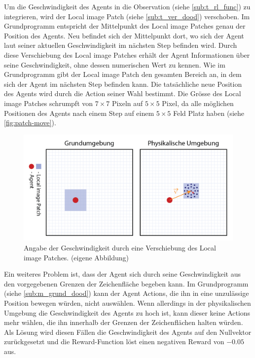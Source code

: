 Um die Geschwindigkeit des Agents in die Observation (siehe
\ref{sub:t_rl_func}) zu integrieren, wird der Local image Patch (siehe
\ref{sub:t_ver_dood}) verschoben. Im Grundprogramm entspricht der
Mittelpunkt des Local image Patches genau der Position des Agents. Neu befindet
sich der Mittelpunkt dort, wo sich der Agent laut seiner aktuellen
Geschwindigkeit im nächsten Step befinden wird. Durch diese Verschiebung des
Local image Patches erhält der Agent Informationen über seine Geschwindigkeit,
ohne dessen numerischen Wert zu kennen. Wie im Grundprogramm gibt der Local
image Patch den gesamten Bereich an, in dem sich der Agent im nächsten Step
befinden kann. Die tatsächliche neue Position des Agents wird durch die Action
seiner Wahl bestimmt. Die Grösse des Local image Patches schrumpft von
$7\times7$ Pixeln auf $5\times5$ Pixel, da alle möglichen Positionen des Agents
nach einem Step auf einem $5\times5$ Feld Platz haben (siehe
\autoref{fig:patch-move}).
 
\begin{figure}[!ht]
 \centering
 \includegraphics[width=\textwidth]{images/methode/patch-move.png}
 \caption{Angabe der Geschwindigkeit durch eine Verschiebung des Local image Patches. (eigene Abbildung)}\label{fig:patch-move}
\end{figure}
 
Ein weiteres Problem ist, dass der Agent sich durch seine Geschwindigkeit aus
den vorgegebenen Grenzen der Zeichenfläche begeben kann. Im Grundprogramm 
(siehe \ref{sub:m_grund_dood}) kann der Agent Actions, die ihn in eine
unzulässige Position bewegen würden, nicht auswählen. Wenn allerdings in der
physikalischen Umgebung die Geschwindigkeit des Agents zu hoch ist, kann dieser
keine Actions mehr wählen, die ihn innerhalb der Grenzen der Zeichenflächen
halten würden. Als Lösung wird diesen Fällen die Geschwindigkeit des Agents auf den
Nullvektor zurückgesetzt und die Reward-Function löst einen negativen Reward von
$-0.05$ aus.


